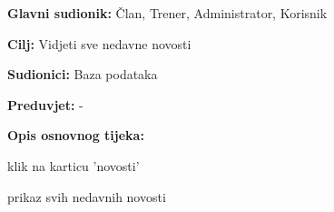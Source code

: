 					\noindent {}
					\begin{packed_item}
	
						\item \textbf{Glavni sudionik: }Član, Trener, Administrator, Korisnik
						\item  \textbf{Cilj: } Vidjeti sve nedavne novosti
						\item  \textbf{Sudionici: } Baza podataka
						\item  \textbf{Preduvjet: } -
						\item  \textbf{Opis osnovnog tijeka:}
						
						\item[] \begin{packed_enum}
	
							\item klik na karticu 'novosti'
							\item prikaz svih nedavnih novosti
							
						\end{packed_enum}
						
					\end{packed_item}
					
